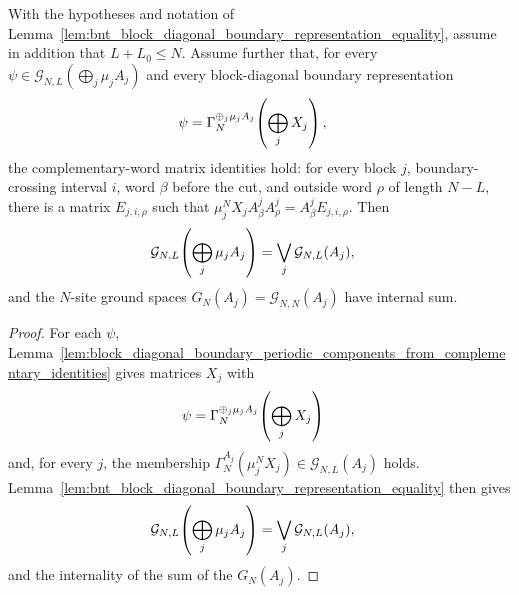 \begin{lemma}
    \label{lem:bnt_block_diagonal_complementary_identities_equality}
    \leanok
    With the hypotheses and notation of
    Lemma~\ref{lem:bnt_block_diagonal_boundary_representation_equality}, assume
    in addition that $L+L_0\le N$. Assume further that, for every
    $\psi\in\mathcal G_{N,L}\!\left(\bigoplus_j\mu_jA_j\right)$
    and every block-diagonal boundary representation
    \begin{align}
        \psi
         & =
        \Gamma_N^{\oplus_j\mu_jA_j}\!\left(\bigoplus_jX_j\right),
        \notag
    \end{align}
    the complementary-word matrix identities hold: for every block $j$,
    boundary-crossing interval $i$, word $\beta$ before the cut, and outside
    word $\rho$ of length $N-L$, there is a matrix $E_{j,i,\rho}$ such that
    $\mu_j^N X_jA^j_\beta A^j_\rho = A^j_\beta E_{j,i,\rho}$.
    Then
    \begin{align}
        \mathcal G_{N,L}\!\left(\bigoplus_j\mu_jA_j\right)
         & =
        \bigvee_j\mathcal G_{N,L}(A_j),
        \notag
    \end{align}
    and the $N$-site ground spaces $G_N(A_j)=\mathcal G_{N,N}(A_j)$
    have internal sum.
\end{lemma}

\begin{proof}
    \leanok
    For each $\psi$,
    Lemma~\ref{lem:block_diagonal_boundary_periodic_components_from_complementary_identities}
    gives matrices $X_j$ with
    \begin{align}
        \psi
         & =
        \Gamma_N^{\oplus_j\mu_jA_j}\!\left(\bigoplus_jX_j\right)
        \notag
    \end{align}
    and, for every $j$, the membership
    $\Gamma_N^{A_j}(\mu_j^N X_j)\in\mathcal G_{N,L}(A_j)$ holds.
    Lemma~\ref{lem:bnt_block_diagonal_boundary_representation_equality}
    then gives
    \begin{align}
        \mathcal G_{N,L}\!\left(\bigoplus_j\mu_jA_j\right)
         & =
        \bigvee_j\mathcal G_{N,L}(A_j),
        \notag
    \end{align}
    and the internality of the sum of the $G_N(A_j)$.
\end{proof}

